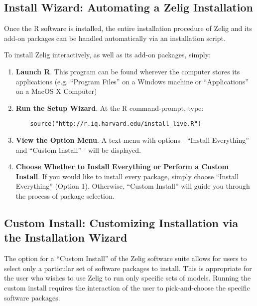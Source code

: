 \subsection{Install Wizard: Automating a Zelig Installation}
\label{subsec:install-wizard}

Once the R software is installed, the entire installation procedure of Zelig and
its add-on packages can be handled automatically via an installation script.

To install Zelig interactively, as well as its add-on packages, simply:

\begin{enumerate}

  \item {\bf Launch R}. This program can be found wherever the computer stores
    its applications (e.g. ``Program Files'' on a Windows machine or
    ``Applications'' on a MacOS X Computer)

  \item {\bf Run the Setup Wizard}. At the R command-prompt, type:
    \begin{verbatim}
    source("http://r.iq.harvard.edu/install_live.R")
    \end{verbatim}

  \item {\bf View the Option Menu}.
    A text-menu with options - ``Install Everything'' and ``Custom Install'' -
    will be displayed. 

  \item {\bf Choose Whether to Install Everything or Perform a Custom Install}.
    If you would like to install every package, simply choose
    ``Install Everything'' (Option 1). Otherwise, ``Custom Install'' will
    guide you through the process of package selection.

\end{enumerate}

\subsection{Custom Install: Customizing Installation via the Installation Wizard}
\label{subsec:custominstall}

The option for a ``Custom Install'' of the Zelig software suite allows for
users to select only a particular set of software packages to install.
This is appropriate for the user who wishes to use Zelig to run only specific
sets of models. Running the custom install requires the interaction of the user
to pick-and-choose the specific software packages.

